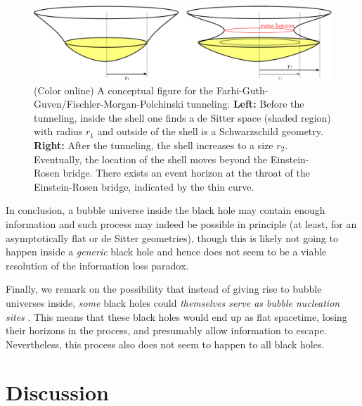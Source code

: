 \documentclass[12pt]{article}
\newcommand{\2}{$^2$}
\newcommand{\3}{$^3$}
\newcommand{\4}{$_4$}
\newcommand{\5}{$_5$}
\begin{document}
\begin{figure}
\begin{center}
\includegraphics[scale=0.4]{FGG_2-eps-converted-to.pdf}
\caption{\label{fig:FGG_2} (Color online) A conceptual figure for the Farhi-Guth-Guven/Fischler-Morgan-Polchinski tunneling: 
\textbf{Left:} Before the tunneling, inside the shell one finds a de Sitter space (shaded region) with radius $r_1$ and outside of the shell is a Schwarzschild geometry. \textbf{Right:} After the tunneling, the shell increases to a size $r_2$. Eventually, the location of the shell moves beyond the Einstein-Rosen bridge. There exists an event horizon at the throat of the Einstein-Rosen bridge, indicated by the thin curve.}
\end{center}
\end{figure}

In conclusion, a bubble universe inside the black hole may contain enough information and such process may indeed be possible in principle (at least, for an asymptotically flat or de Sitter geometries), though this is likely not going to happen inside a \emph{generic} black hole and hence does not seem to be a viable resolution of the information loss paradox.

Finally, we remark on the possibility that instead of giving rise to bubble universes inside, \emph{some} black holes could \emph{themselves serve as bubble nucleation sites} \cite{1401.0017}. This means that these black holes would end up as flat spacetime, losing their horizons in the process, and presumably allow information to escape.  Nevertheless, this process also does not seem to happen to all black holes.



\section{Discussion}\label{discussion}
\end{document}
